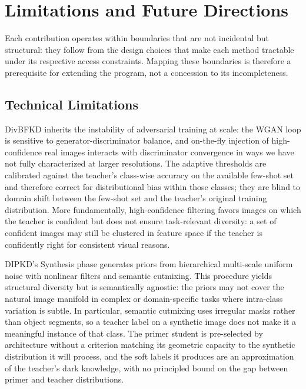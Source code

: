 \section{Limitations and Future Directions} \label{sec:62-conclusion-future}

\begin{foldable}
  Each contribution operates within boundaries that are not incidental but structural: they follow from the design choices that make each method tractable under its respective access constraints.
  Mapping these boundaries is therefore a prerequisite for extending the program, not a concession to its incompleteness.
\end{foldable}

\subsection{Technical Limitations} \label{subsec:62-conclusion-future-technical}

\begin{foldable}
  DivBFKD inherits the instability of adversarial training at scale: the WGAN loop is sensitive to generator-discriminator balance, and on-the-fly injection of high-confidence real images interacts with discriminator convergence in ways we have not fully characterized at larger resolutions.
  The adaptive thresholds are calibrated against the teacher's class-wise accuracy on the available few-shot set and therefore correct for distributional bias within those classes; they are blind to domain shift between the few-shot set and the teacher's original training distribution.
  More fundamentally, high-confidence filtering favors images on which the teacher is confident but does not ensure task-relevant diversity: a set of confident images may still be clustered in feature space if the teacher is confidently right for consistent visual reasons.
\end{foldable}

\begin{foldable}
  DIPKD's Synthesis phase generates priors from hierarchical multi-scale uniform noise with nonlinear filters and semantic cutmixing.
  This procedure yields structural diversity but is semantically agnostic: the priors may not cover the natural image manifold in complex or domain-specific tasks where intra-class variation is subtle.
  In particular, semantic cutmixing uses irregular masks rather than object segments, so a teacher label on a synthetic image does not make it a meaningful instance of that class.
  The primer student is pre-selected by architecture without a criterion matching its geometric capacity to the synthetic distribution it will process, and the soft labels it produces are an approximation of the teacher's dark knowledge, with no principled bound on the gap between primer and teacher distributions.
\end{foldable}

